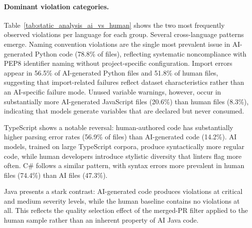 \paragraph{Dominant violation categories.}
Table~\ref{tab:static_analysis_ai_vs_human} shows the two most frequently observed violations per language for each group. Several cross-language patterns emerge. Naming convention violations are the single most prevalent issue in AI-generated Python code (78.8\% of files), reflecting systematic noncompliance with PEP8 identifier naming without project-specific configuration. Import errors appear in 56.5\% of AI-generated Python files and 51.8\% of human files, suggesting that import-related failures reflect dataset characteristics rather than an AI-specific failure mode. Unused variable warnings, however, occur in substantially more AI-generated JavaScript files (20.6\%) than human files (8.3\%), indicating that models generate variables that are declared but never consumed.

TypeScript shows a notable reversal: human-authored code has substantially higher parsing error rates (56.9\% of files) than AI-generated code (14.2\%). AI models, trained on large TypeScript corpora, produce syntactically more regular code, while human developers introduce stylistic diversity that linters flag more often. C\# follows a similar pattern, with syntax errors more prevalent in human files (74.4\%) than AI files (47.3\%).

Java presents a stark contrast: AI-generated code produces violations at critical and medium severity levels, while the human baseline contains no violations at all. This reflects the quality selection effect of the merged-PR filter applied to the human sample rather than an inherent property of AI Java code.

